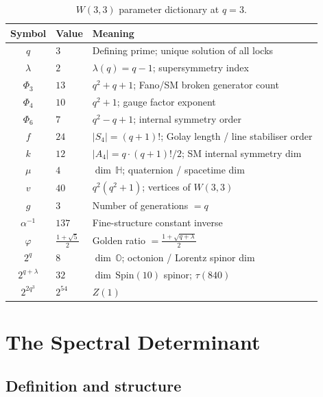 \begin{table}[h]
\centering
\caption{$W(3,3)$ parameter dictionary at $q=3$.}
\label{tab:params}
\renewcommand{\arraystretch}{1.3}
\begin{tabular}{cll}
\toprule
Symbol & Value & Meaning \\
\midrule
$q$            & $3$  & Defining prime; unique solution of all locks \\
$\lambda$      & $2$  & $\lambda(q)= q-1$; supersymmetry index \\
$\Phi_3$       & $13$ & $q^2+q+1$; Fano/SM broken generator count \\
$\Phi_4$       & $10$ & $q^2+1$; gauge factor exponent \\
$\Phi_6$       & $7$  & $q^2-q+1$; internal symmetry order \\
$f$            & $24$ & $|S_4|=(q+1)!$; Golay length / line stabiliser order \\
$k$            & $12$ & $|A_4|=q\cdot(q+1)!/ 2$; SM internal symmetry dim \\
$\mu$          & $4$  & $\dim\,\mathbb{H}$; quaternion / spacetime dim \\
$v$            & $40$ & $q^2(q^2+1)$; vertices of $W(3,3)$ \\
$g$            & $3$  & Number of generations $= q$ \\
$\alpha^{-1}$  & $137$& Fine-structure constant inverse \\
$\varphi$      & $\tfrac{1+\sqrt{5}}{2}$  & Golden ratio $= \tfrac{1+\sqrt{q+\lambda}}{2}$ \\
$2^q$          & $8$  & $\dim\,\mathbb{O}$; octonion / Lorentz spinor dim \\
$2^{q+\lambda}$& $32$ & $\dim\,\mathrm{Spin}(10)$ spinor; $\tau(840)$ \\
$2^{2q^3}$     & $2^{54}$ & $Z(1)$ \\
\bottomrule
\end{tabular}
\end{table}

\section{The Spectral Determinant}
\label{sec:spectral_det}

\subsection{Definition and structure}

